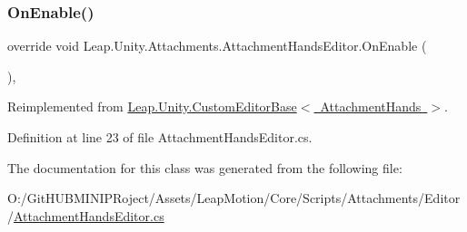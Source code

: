 \subsubsection{\texorpdfstring{OnEnable()}{OnEnable()}}
{\footnotesize\ttfamily override void Leap.\+Unity.\+Attachments.\+Attachment\+Hands\+Editor.\+On\+Enable (\begin{DoxyParamCaption}{ }\end{DoxyParamCaption})\hspace{0.3cm}{\ttfamily [protected]}, {\ttfamily [virtual]}}



Reimplemented from \mbox{\hyperlink{class_leap_1_1_unity_1_1_custom_editor_base_a2268bc01655342bd3da5ae015bfa2f93}{Leap.\+Unity.\+Custom\+Editor\+Base$<$ Attachment\+Hands $>$}}.



Definition at line 23 of file Attachment\+Hands\+Editor.\+cs.



The documentation for this class was generated from the following file\+:\begin{DoxyCompactItemize}
\item 
O\+:/\+Git\+H\+U\+B\+M\+I\+N\+I\+P\+Roject/\+Assets/\+Leap\+Motion/\+Core/\+Scripts/\+Attachments/\+Editor/\mbox{\hyperlink{_attachment_hands_editor_8cs}{Attachment\+Hands\+Editor.\+cs}}\end{DoxyCompactItemize}
